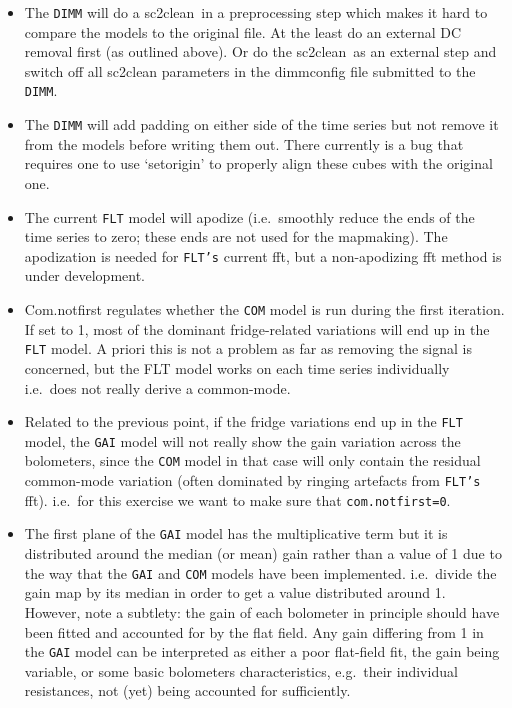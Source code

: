 \documentclass[twoside,11pt]{article}
\newcommand{\xref}[3]{#1}
\renewcommand{\_}{\texttt{\symbol{95}}}
\newcommand{\task}[1]{\textsf{#1}}
\newcommand{\clean}{\xref{\task{sc2clean}}{sun258}{SC2CLEAN}}
\begin{document}
\begin{itemize}
\item The \texttt{DIMM} will do a \clean\  in a preprocessing step
which makes it hard to compare the models to the original file. At the
least do an external DC removal first (as outlined above).  Or do the
\clean\  as an external step and switch off all sc2clean parameters in
the dimmconfig file submitted to the \texttt{DIMM}.

\item The \texttt{DIMM} will add padding on either side of the time
series but not remove it from the models before writing them
out. There currently is a bug that requires one to use `setorigin' to
properly align these cubes with the original one.

\item The current \texttt{FLT} model will apodize (i.e.\ smoothly
reduce the ends of the time series to zero; these ends are not used
for the mapmaking). The apodization is needed for \texttt{FLT's}
current fft, but a non-apodizing fft method is under development.

\item Com.notfirst regulates whether the \texttt{COM} model is run
during the first iteration. If set to 1, most of the dominant
fridge-related variations will end up in the \texttt{FLT} model. A
priori this is not a problem as far as removing the signal is
concerned, but the FLT model works on each time series individually
i.e.\ does not really derive a common-mode.

\item Related to the previous point, if the fridge variations end up
in the \texttt{FLT} model, the \texttt{GAI} model will not really show
the gain variation across the bolometers, since the \texttt{COM} model
in that case will only contain the residual common-mode variation
(often dominated by ringing artefacts from \texttt{FLT's} fft). i.e.\
for this exercise we want to make sure that \texttt{com.notfirst=0}.

\item The first plane of the \texttt{GAI} model has the multiplicative
term but it is distributed around the median (or mean) gain rather
than a value of 1 due to the way that the \texttt{GAI} and
\texttt{COM} models have been implemented. i.e.\ divide the gain map
by its median in order to get a value distributed around 1. However,
note a subtlety: the gain of each bolometer in principle should have
been fitted and accounted for by the flat field.  Any gain differing
from 1 in the \texttt{GAI} model can be interpreted as either a poor
flat-field fit, the gain being variable, or some basic bolometers
characteristics, e.g.\ their individual resistances, not (yet) being
accounted for sufficiently.
\end{itemize}
\end{document}
